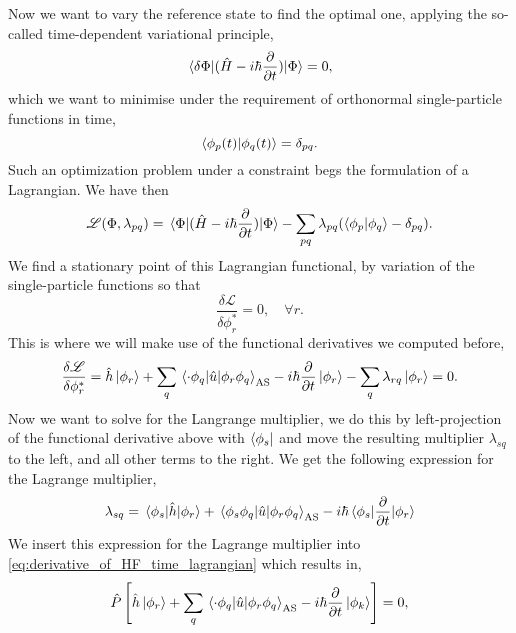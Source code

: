Now we want to vary the reference state to find the optimal one, 
applying the so-called time-dependent variational principle\cite{dirac1930principles},
\begin{equation}
    \mel{\delta\Phi}{(\hat{H} - i\hbar\frac{\partial}{\partial t})}{\Phi} = 0,
\end{equation}
which we want to minimise under the requirement of orthonormal single-particle functions
in time,
\begin{equation}
    \braket{\phi_p(t)}{\phi_q(t)} = \delta_{pq}.
\end{equation}
Such an optimization problem under a constraint begs the formulation of a Lagrangian.
We have then
\begin{equation}
    \mathscr{L}(\Phi, \lambda_{pq}) = 
        \mel{\Phi}{(\hat{H} - i\hbar\frac{\partial}{\partial t})}{\Phi}
        - \sum_{pq} \lambda_{pq} (\braket{\phi_p}{\phi_q} - \delta_{pq}).
\end{equation}
We find a stationary point of this Lagrangian functional, by variation of the single-particle 
functions so that 
\begin{equation}
    \frac{\delta\mathscr{L}}{\delta \phi_r^*} = 0, \quad \forall r.
\end{equation}
This is where we will make use of the functional derivatives we computed before,
\begin{equation}
    \label{eq:derivative_of_HF_time_lagrangian}
    \frac{\delta\mathscr{L}}{\delta \phi_r^*}
    = \hat{h}\ket{\phi_r} 
        + \sum_q\mel{\cdot\phi_q}{\hat{u}}{\phi_r\phi_q}_\text{AS}
        - i\hbar\frac{\partial}{\partial t} \ket{\phi_r}
        - \sum_q \lambda_{rq} \ket{\phi_r} = 0.
\end{equation}
Now we want to solve for the Langrange multiplier, we do this by left-projection of the 
functional derivative above with $\bra{\phi_s}$ and move the resulting multiplier $\lambda_{sq}$
to the left, and all other terms to the right. We 
get the following expression for the Lagrange multiplier,
\begin{equation}
    \lambda_{sq} = \mel{\phi_s}{\hat{h}}{\phi_r} 
        + \mel{\phi_s\phi_q}{\hat{u}}{\phi_r\phi_q}_\text{AS}
        - i\hbar \mel{\phi_s}{\frac{\partial}{\partial t}}{\phi_r}
\end{equation}
We insert this expression for the Lagrange multiplier into \autoref{eq:derivative_of_HF_time_lagrangian}
which results in,
\begin{equation}
    \label{eq:projected_time_hf_eqn}
    \hat{P}\left[\hat{h}\ket{\phi_r}
        + \sum_q\mel{\cdot\phi_q}{\hat{u}}{\phi_r\phi_q}_\text{AS}
        - i\hbar\frac{\partial}{\partial t} \ket{\phi_k}\right] = 0,
\end{equation}
